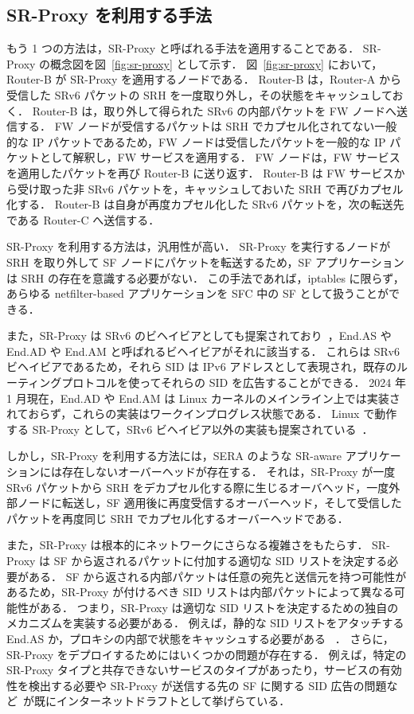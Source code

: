 \subsection*{SR-Proxy を利用する手法}
\label{sbsection:use-sr-proxy}
もう 1 つの方法は，SR-Proxy と呼ばれる手法を適用することである．
SR-Proxy の概念図を図~\ref*{fig:sr-proxy} として示す．
図~\ref*{fig:sr-proxy} において，Router-B が SR-Proxy を適用するノードである．
Router-B は，Router-A から受信した SRv6 パケットの SRH を一度取り外し，その状態をキャッシュしておく．
Router-B は，取り外して得られた SRv6 の内部パケットを FW ノードへ送信する．
FW ノードが受信するパケットは SRH でカプセル化されてない一般的な IP パケットであるため，FW ノードは受信したパケットを一般的な IP パケットとして解釈し，FW サービスを適用する．
FW ノードは，FW サービスを適用したパケットを再び Router-B に送り返す．
Router-B は FW サービスから受け取った非 SRv6 パケットを，キャッシュしておいた SRH で再びカプセル化する．
Router-B は自身が再度カプセル化した SRv6 パケットを，次の転送先である Router-C へ送信する．

SR-Proxy を利用する方法は，汎用性が高い．
SR-Proxy を実行するノードが SRH を取り外して SF ノードにパケットを転送するため，SF アプリケーションは SRH の存在を意識する必要がない．
この手法であれば，iptables に限らず，あらゆる netfilter-based アプリケーションを SFC 中の SF として扱うことができる．

また，SR-Proxy は SRv6 のビヘイビアとしても提案されており~\cite{filsfils-spring-srv6-interop-02}，End.AS や End.AD や End.AM と呼ばれるビヘイビアがそれに該当する．
これらは SRv6 ビヘイビアであるため，それら SID は IPv6 アドレスとして表現され，既存のルーティングプロトコルを使ってそれらの SID を広告することができる．
2024 年 1 月現在，End.AD や End.AM は Linux カーネルのメインライン上では実装されておらず，これらの実装はワークインプログレス状態である．
Linux で動作する SR-Proxy として，SRv6 ビヘイビア以外の実装も提案されている~\cite{sfc-proxy-bpf,sfc-with-leg-vnf,afxdp-for-srv6}．

しかし，SR-Proxy を利用する方法には，SERA のような SR-aware アプリケーションには存在しないオーバーヘッドが存在する．
それは，SR-Proxy が一度 SRv6 パケットから SRH をデカプセル化する際に生じるオーバヘッド，一度外部ノードに転送し，SF 適用後に再度受信するオーバーヘッド，そして受信したパケットを再度同じ SRH でカプセル化するオーバーヘッドである．

また，SR-Proxy は根本的にネットワークにさらなる複雑さをもたらす．
SR-Proxy は SF から返されるパケットに付加する適切な SID リストを決定する必要がある．
SF から返される内部パケットは任意の宛先と送信元を持つ可能性があるため，SR-Proxy が付けるべき SID リストは内部パケットによって異なる可能性がある．
つまり，SR-Proxy は適切な SID リストを決定するための独自のメカニズムを実装する必要がある．
例えば，静的な SID リストをアタッチする End.AS か，プロキシの内部で状態をキャッシュする必要がある~\cite{sfc-proxy-bpf} ．
さらに，SR-Proxy をデプロイするためにはいくつかの問題が存在する．
例えば，特定の SR-Proxy タイプと共存できないサービスのタイプがあったり，サービスの有効性を検出する必要や SR-Proxy が送信する先の SF に関する SID 広告の問題など~\cite{draft-scexp}が既にインターネットドラフトとして挙げらている．


